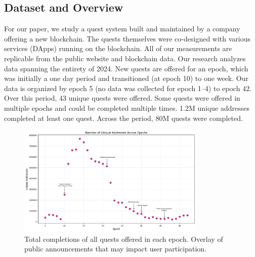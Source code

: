 
\subsection{Dataset and Overview}

For our paper, we study a quest system built and maintained by a company offering a new blockchain. The quests themselves were co-designed with various services (DApps) running on the blockchain. All of our measurements are replicable from the public website and blockchain data. Our research analyzes data spanning the entirety of 2024. New quests are offered for an epoch, which was initially a one day period and transitioned (at epoch 10) to one week. Our data is organized by epoch 5 (no data was collected for epoch 1--4) to epoch 42. Over this period, 43 unique quests were offered. Some quests were offered in multiple epochs and could be completed multiple times. 1.2M unique addresses completed at least one quest.  Across the period, 80M quests were completed.

\begin{figure}[t]
    \centering
    \includegraphics[width=0.8\textwidth]{figures/events.png}
    \caption{Total completions of all quests offered in each epoch. Overlay of public announcements that may impact user participation.}
    \label{fig:events}
\end{figure}

